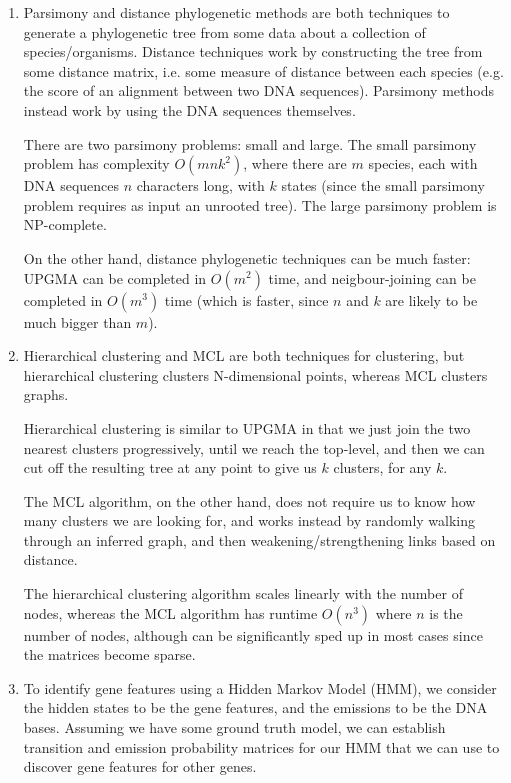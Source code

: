 


\begin{enumerate}[label=(\alph*)]
    \item
        Parsimony and distance phylogenetic methods are both techniques to generate a phylogenetic tree from some data about a collection of species/organisms. Distance techniques work by constructing the tree from some distance matrix, i.e. some measure of distance between each species (e.g. the score of an alignment between two DNA sequences). Parsimony methods instead work by using the DNA sequences themselves.

        There are two parsimony problems: small and large. The small parsimony problem has complexity $O(mnk^2)$, where there are $m$ species, each with DNA sequences $n$ characters long, with $k$ states (since the small parsimony problem requires as input an unrooted tree). The large parsimony problem is NP-complete.

        On the other hand, distance phylogenetic techniques can be much faster: UPGMA can be completed in $O(m^2)$ time, and neigbour-joining can be completed in $O(m^3)$ time (which is faster, since $n$ and $k$ are likely to be much bigger than $m$).

    \item
        Hierarchical clustering and MCL are both techniques for clustering, but hierarchical clustering clusters N-dimensional points, whereas MCL clusters graphs.

        Hierarchical clustering is similar to UPGMA in that we just join the two nearest clusters progressively, until we reach the top-level, and then we can cut off the resulting tree at any point to give us $k$ clusters, for any $k$.

        The MCL algorithm, on the other hand, does not require us to know how many clusters we are looking for, and works instead by randomly walking through an inferred graph, and then weakening/strengthening links based on distance. 

        The hierarchical clustering algorithm scales linearly with the number of nodes, whereas the MCL algorithm has runtime $O(n^3)$ where $n$ is the number of nodes, although can be significantly sped up in most cases since the matrices become sparse.

    \item
        To identify gene features using a Hidden Markov Model (HMM), we consider the hidden states to be the gene features, and the emissions to be the DNA bases. Assuming we have some ground truth model, we can establish transition and emission probability matrices for our HMM that we can use to discover gene features for other genes.


\end{enumerate}
